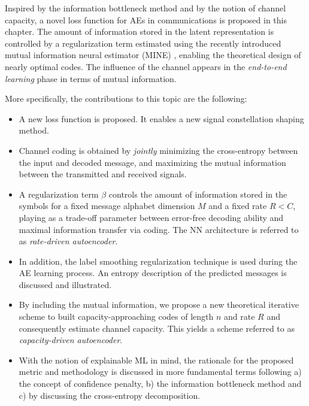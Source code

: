 Inspired by the information bottleneck method \cite{Tishby1999} and by the notion of channel capacity, a novel loss function for AEs in communications is proposed in this chapter. The amount of information stored in the latent representation is controlled by a regularization term estimated using the recently introduced mutual information neural estimator (MINE) \cite{Mine2018}, enabling the theoretical design of nearly optimal codes. 
The influence of the channel appears in the \textit{end-to-end learning} phase in terms of mutual information. 

More specifically, the contributions to this topic are the following:
\begin{itemize}
\item A new loss function is proposed. It enables a new signal constellation shaping method.
\item Channel coding is obtained by \textit{jointly} minimizing the cross-entropy between the input and decoded message, and maximizing the mutual information between the transmitted and received signals.
\item A regularization term $\beta$ controls the amount of information stored in the symbols for a fixed message alphabet dimension $M$ and a fixed rate $R<C$, playing as a trade-off parameter between error-free decoding ability and maximal information transfer via coding. The NN architecture is referred to as \textit{rate-driven autoencoder}.
\item In addition, the label smoothing regularization technique is used during the AE learning process. An entropy description of the predicted messages is discussed and illustrated. 
\item By including the mutual information, we propose a new theoretical iterative scheme to built capacity-approaching codes of length $n$ and rate $R$ and consequently estimate channel capacity. This yields a scheme referred to as \textit{capacity-driven autoencoder}.
\item With the notion of explainable ML in mind, the rationale for the proposed metric and methodology is discussed in more fundamental terms following a) the concept of confidence penalty, b) the information bottleneck method \cite{Tishby1999} and c) by discussing the cross-entropy decomposition.  
\end{itemize} 


